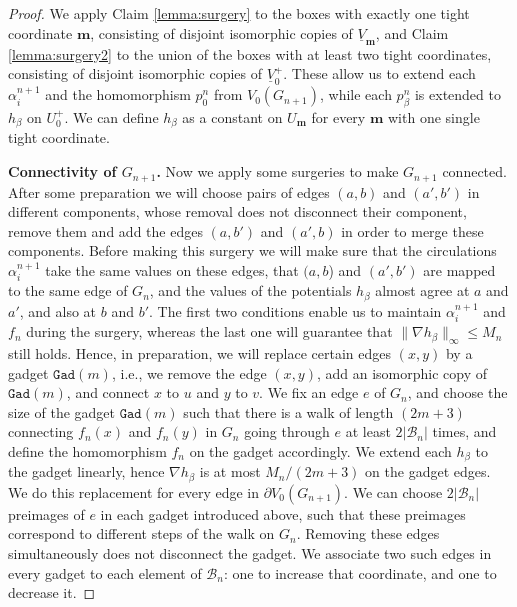 \documentclass[10pt]{article}
\theoremstyle{plain}
\theoremstyle{remark}
\newcommand{\1}{\mathbbm{1}}
\numberwithin{equation}{section}
\begin{document}
\begin{proof}
We apply Claim \ref{lemma:surgery} to the boxes with exactly one tight coordinate $\mathbf{m}$, consisting of disjoint isomorphic copies of $\underline{V}_{\mathbf{m}}$, and Claim \ref{lemma:surgery2} to the union of the boxes with at least two tight coordinates, consisting of disjoint isomorphic copies of $\underline{V}_0^+$. These allow us to extend each $\alpha_i^{n+1}$ and the homomorphism $p_0^n$ from $V_0(G_{n+1})$, while each $p^n_{\beta}$ is extended to $h_\beta$ on $U_0^+$. We can define $h_\beta$ as a constant on $U_{\mathbf{m}}$ for every $\mathbf{m}$ with one single tight coordinate. 

{\bf Connectivity of $G_{n+1}$.} Now we apply some surgeries to make $G_{n+1}$ connected. After some preparation we will choose pairs of edges $(a,b)$ and $(a',b')$ in different components, whose removal does not disconnect their component, remove them and add the edges $(a,b')$ and $(a',b)$ in order to merge these components. Before making this surgery we will make sure that the circulations $\alpha_i^{n+1}$ take the same values on these edges, that $(a,b$) and $(a',b')$ are mapped to the same edge of $G_n$, and the values of the potentials $h_{\beta}$ almost agree at $a$ and $a'$, and also at $b$ and $b'$. The first two conditions enable us to maintain $\alpha_i^{n+1}$ and $f_n$ during the surgery, whereas the last one will guarantee that $\|\nabla h_{\beta}\|_{\infty} \leq M_n$ still holds. Hence, in preparation, we will replace certain edges $(x,y)$ by a gadget $\texttt{Gad}(m)$, i.e., we remove the edge $(x,y)$, add an isomorphic copy of $\texttt{Gad}(m)$, and connect $x$ to $u$ and $y$ to $v$. We fix an edge $e$ of $G_n$, and choose the size of the gadget $\texttt{Gad}(m)$ such that there is a walk of length $(2m+3)$ connecting $f_n(x)$ and $f_n(y)$ in $G_n$ going through $e$ at least $2|\mathcal{B}_n|$ times, and define the homomorphism $f_n$ on the gadget accordingly. We extend each $h_{\beta}$ to the gadget linearly, hence $\nabla h_{\beta}$ is at most $M_n/(2m+3)$ on the gadget edges. We do this replacement for every edge in $\partial V_0(G_{n+1})$. We can choose $2|\mathcal{B}_n|$ preimages of $e$ in each gadget introduced above, such that these preimages correspond to different steps of the walk on $G_n$. Removing these edges simultaneously does not disconnect the gadget. We associate two such edges in every gadget to each element of $\mathcal{B}_n$: one to increase that coordinate, and one to decrease it.   


\end{proof}
\end{document}
